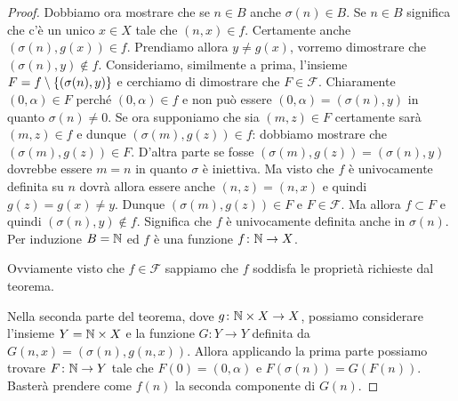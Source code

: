 \begin{proof}
Dobbiamo ora mostrare che se $n\in B$ anche $\sigma(n)\in B$.
Se $n\in B$ significa che c'è un unico $x\in X$ tale che $(n,x)\in f$.
Certamente anche $(\sigma(n),g(x))\in f$.
Prendiamo allora $y\neq g(x)$, vorremo dimostrare che $(\sigma(n),y)\not \in f$.
Consideriamo, similmente a prima, l'insieme $F=f\setminus{\left\{ (\sigma(n),y) \right\}}$
e cerchiamo di dimostrare che $F\in \mathcal F$.
Chiaramente $(0,\alpha)\in F$ perché $(0,\alpha)\in f$ 
e non può essere $(0,\alpha)=(\sigma(n),y)$ in quanto $\sigma(n)\neq 0$.
Se ora supponiamo che sia $(m,z)\in F$ certamente sarà $(m,z)\in f$ 
e dunque $(\sigma(m),g(z))\in f$: 
dobbiamo mostrare che $(\sigma(m),g(z))\in F$. 
D'altra parte se fosse $(\sigma(m), g(z))=(\sigma(n),y)$ 
dovrebbe essere $m=n$ in quanto $\sigma$ è iniettiva. 
Ma visto che $f$ è univocamente definita su $n$ dovrà allora essere 
anche $(n,z) = (n,x)$ e quindi $g(z)=g(x) \neq y$. 
Dunque $(\sigma(m),g(z))\in F$ e $F\in \mathcal F$.
Ma allora $f\subset F$ e quindi $(\sigma(n),y)\not \in f$.
Significa che $f$ è univocamente definita anche in $\sigma(n)$.
Per induzione $B={\mathbb N}$ ed $f$ è una funzione $f\colon {\mathbb N}\to X$.

Ovviamente visto che $f\in \mathcal F$ sappiamo che $f$ 
soddisfa le proprietà richieste dal teorema.

Nella seconda parte del teorema, dove $g\colon {\mathbb N}\times X \to X$,
possiamo considerare l'insieme $Y={\mathbb N}\times X$ e la funzione 
$G\colon Y\to Y$ definita da $G(n,x) = (\sigma(n), g(n,x))$.
Allora applicando la prima parte possiamo trovare $F\colon {\mathbb N}\to Y$
tale che $F(0) = (0,\alpha)$ e $F(\sigma(n)) = G(F(n))$.
Basterà prendere come $f(n)$ la seconda componente di $G(n)$.
\end{proof}

